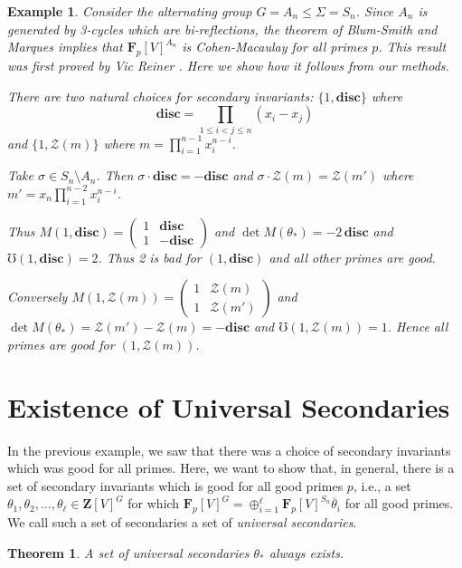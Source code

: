 \documentclass[12pt]{amsart}
\renewcommand{\leq}{\leqslant}
\newcommand{\ZZ}{\mathbf{Z}} %
\newcommand{\FF}{\mathbf{F}} %
\newcommand{\ZZ}{\mathbb{Z}} %
\newcommand{\FF}{\mathbb{F}} %
\newcommand{\Sn}{{S_n}}
\newtheorem{theorem}[thm]{Theorem}
\newtheorem{example}[thm]{Example}
\theoremstyle{definition}
\newcommand{\disc}{{\mathbf{disc}}}
\newcommand{\calz}{\mathcal{Z}}
\newcommand{\btheta}{{\overline{\theta}}}
\newcommand{\bth}{{{\theta_*}}} %
\begin{document}
\begin{example}\label{ex:alternating group}
  Consider the alternating group
$G=A_n \le \Sigma=\Sn$.  Since $A_n$ is generated by 3-cycles which are bi-reflections, the theorem of Blum-Smith and Marques implies that $\FF_p[V]^{A_n}$ is Cohen-Macaulay for all primes $p$.  This result was first proved by Vic Reiner \cite{ReinerThesis}.  Here we show how it follows from our methods.


There are two natural choices for secondary invariants: 
$\{1,\disc\}$ where 
    $$
        \disc = \prod_{1\leq i<j\leq n}(x_i-x_j)$$ 
and $\{1,\calz(m)\}$ where $m=\prod_{i=1}^{n-1} x_i^{n-i}$.  

Take $\sigma \in \Sn \setminus A_n$.
Then $\sigma\cdot \disc = -\disc$ and $\sigma\cdot \calz(m) = \calz({m'})$ where 
$m'= x_n\prod_{i=1}^{n-2} x_i^{n-i}$.

Thus $M(1,\disc)=
\begin{pmatrix}
    1 & \disc\\
    1 & -\disc
\end{pmatrix}$
and $\det M(\bth)=-2\,\disc$ and 
$\mho(1,\disc)=2$.
Thus 2 is bad for $(1,\disc)$ and all other primes are good.

Conversely $M(1,\calz(m))=
\begin{pmatrix}
    1 & \calz(m)\\
    1 & \calz({m'})
\end{pmatrix}$
and $\det M(\bth)=\calz({m'})-\calz({m}) =-\disc$ and 
$\mho(1,\calz(m))=1$.
Hence all primes are good for $(1,\calz(m))$.
\end{example}

\section{Existence of Universal Secondaries}\label{existence}

In the previous example, we saw that there was a choice of secondary invariants
which was good for all primes.
Here, we want to show that, in general, there is a set of secondary invariants
which is good for all good primes $p$, i.e., a set
$\theta_1,\theta_2,\dots,\theta_\ell \in \ZZ[V]^G$ for which
$\FF_p[V]^G = \oplus_{i=1}^\ell \FF_p[V]^{\Sn} \btheta_i$ for all good primes.
We call such a set of secondaries a set of \emph{universal secondaries}.
\begin{theorem}   
A set of universal secondaries $\bth$ always exists. 
\end{theorem}
\end{document}
